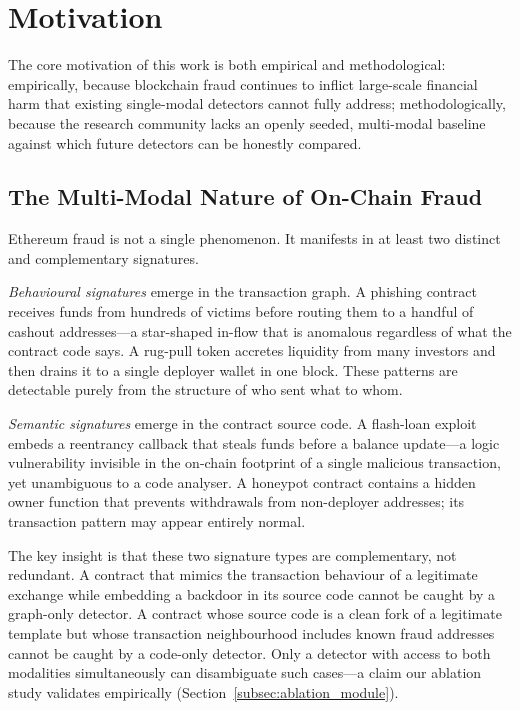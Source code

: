 \section{Motivation}
\label{sec:motivation}

The core motivation of this work is both empirical and methodological:
empirically, because blockchain fraud continues to inflict large-scale
financial harm that existing single-modal detectors cannot fully address;
methodologically, because the research community lacks an openly seeded,
multi-modal baseline against which future detectors can be honestly
compared.

\subsection{The Multi-Modal Nature of On-Chain Fraud}

Ethereum fraud is not a single phenomenon.  It manifests in at least two
distinct and complementary signatures.

\emph{Behavioural signatures} emerge in the transaction graph.
A phishing contract receives funds from hundreds of victims before routing
them to a handful of cashout addresses---a star-shaped in-flow that is
anomalous regardless of what the contract code says.
A rug-pull token accretes liquidity from many investors and then drains it
to a single deployer wallet in one block.
These patterns are detectable purely from the structure of who sent what
to whom.

\emph{Semantic signatures} emerge in the contract source code.
A flash-loan exploit embeds a reentrancy callback that steals funds
before a balance update---a logic vulnerability invisible in the on-chain
footprint of a single malicious transaction, yet unambiguous to a code
analyser.
A honeypot contract contains a hidden owner function that prevents
withdrawals from non-deployer addresses; its transaction pattern may
appear entirely normal.

The key insight is that these two signature types are complementary, not
redundant.
A contract that mimics the transaction behaviour of a legitimate exchange
while embedding a backdoor in its source code cannot be caught by a
graph-only detector.
A contract whose source code is a clean fork of a legitimate template but
whose transaction neighbourhood includes known fraud addresses cannot be
caught by a code-only detector.
Only a detector with access to both modalities simultaneously can
disambiguate such cases---a claim our ablation study validates
empirically (Section~\ref{subsec:ablation_module}).

